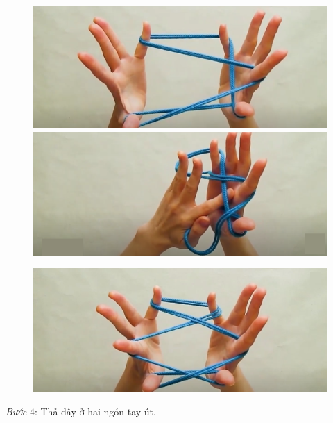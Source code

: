 \begin{multicols}{2}
\begin{figure}[H]
		\vspace*{1pt}
		\includegraphics[width=0.8\linewidth]{3b}
%		
		\vspace*{1pt}
		\includegraphics[width=0.8\linewidth]{3c}
%		
	\end{figure}
		\begin{figure}[H]
		\vspace*{5pt}
		\centering
		\captionsetup{labelformat= empty, justification=centering}
%		
		\hspace*{1pt}\includegraphics[width=0.8\linewidth]{3d}
		\vspace*{-10pt}
	\end{figure}
	\textit{Bước} $4$: Thả dây ở hai ngón tay út.
	\begin{figure}[H]

\end{figure}
\end{multicols}
